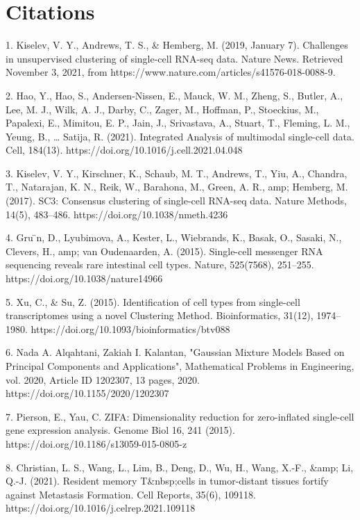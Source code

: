 \documentclass[12pt]{article}
\theoremstyle{definition}
\begin{document}
\section*{Citations}
1. Kiselev, V. Y., Andrews, T. S., & Hemberg, M. (2019, January 7). Challenges in unsupervised clustering of single-cell RNA-seq data. Nature News. Retrieved November 3, 2021, from https://www.nature.com/articles/s41576-018-0088-9. 

2. Hao, Y., Hao, S., Andersen-Nissen, E., Mauck, W. M., Zheng, S., Butler, A., Lee, M. J., Wilk, A. J., Darby, C., Zager, M., Hoffman, P., Stoeckius, M., Papalexi, E., Mimitou, E. P., Jain, J., Srivastava, A., Stuart, T., Fleming, L. M., Yeung, B., … Satija, R. (2021). Integrated Analysis of multimodal single-cell data. Cell, 184(13). https://doi.org/10.1016/j.cell.2021.04.048 

3. Kiselev, V. Y., Kirschner, K., Schaub, M. T., Andrews, T., Yiu, A., Chandra, T., Natarajan, K. N., Reik, W., Barahona, M., Green, A. R., amp; Hemberg, M. (2017). SC3: Consensus clustering of single-cell RNA-seq data. Nature Methods, 14(5), 483–486. https://doi.org/10.1038/nmeth.4236

4. Gru ̈n, D., Lyubimova, A., Kester, L., Wiebrands, K., Basak, O., Sasaki, N., Clevers, H., amp; van Oudenaarden, A. (2015). Single-cell messenger RNA sequencing reveals rare intestinal cell types. Nature, 525(7568), 251–255. https://doi.org/10.1038/nature14966

5. Xu, C., & Su, Z. (2015). Identification of cell types from single-cell transcriptomes using a novel Clustering Method. Bioinformatics, 31(12), 1974–1980. https://doi.org/10.1093/bioinformatics/btv088 

6. Nada A. Alqahtani, Zakiah I. Kalantan, "Gaussian Mixture Models Based on Principal Components and Applications", Mathematical Problems in Engineering, vol. 2020, Article ID 1202307, 13 pages, 2020. https://doi.org/10.1155/2020/1202307

7. Pierson, E., Yau, C. ZIFA: Dimensionality reduction for zero-inflated single-cell gene expression analysis. Genome Biol 16, 241 (2015). https://doi.org/10.1186/s13059-015-0805-z

8. Christian, L. S., Wang, L., Lim, B., Deng, D., Wu, H., Wang, X.-F., &amp; Li, Q.-J. (2021). Resident memory T&nbsp;cells in tumor-distant tissues fortify against Metastasis Formation. Cell Reports, 35(6), 109118. https://doi.org/10.1016/j.celrep.2021.109118 
\end{document}
